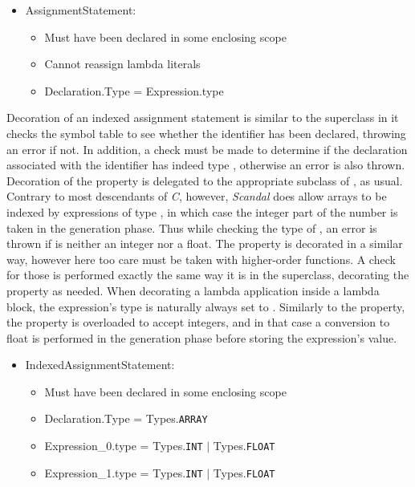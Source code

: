 \begin{itemize}
	\item AssignmentStatement:
		\begin{itemize}
			\item Must have been declared in some enclosing scope
			\item Cannot reassign lambda literals
			\item Declaration.Type = Expression.type
		\end{itemize}
\end{itemize}

Decoration of an indexed assignment statement is similar to the superclass in it checks the symbol table to see whether the identifier has been declared, throwing an error if not. In addition, a check must be made to determine if the declaration associated with the identifier has indeed type , otherwise an error is also thrown. Decoration of the  property is delegated to the appropriate subclass of , as usual. Contrary to most descendants of \emph{C}, however, \emph{Scandal} does allow arrays to be indexed by expressions of type , in which case the integer part of the number is taken in the generation phase. Thus while checking the type of , an error is thrown if is neither an integer nor a float. The  property is decorated in a similar way, however here too care must be taken with higher-order functions. A check for those is performed exactly the same way it is in the superclass, decorating the  property as needed. When decorating a lambda application inside a lambda block, the expression's type is naturally always set to . Similarly to the  property, the  property is overloaded to accept integers, and in that case a conversion to float is performed in the generation phase before storing the expression's value.

\begin{itemize}
	\item IndexedAssignmentStatement:
		\begin{itemize}
			\item Must have been declared in some enclosing scope
			\item Declaration.Type = Types.\texttt{ARRAY}
			\item Expression\_0.type = Types.\texttt{INT} $|$ Types.\texttt{FLOAT}
			\item Expression\_1.type = Types.\texttt{INT} $|$ Types.\texttt{FLOAT}
		\end{itemize}
\end{itemize}

